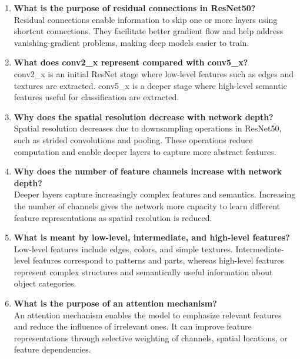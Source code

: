 \documentclass[10pt]{article}
\begin{document}
\begin{enumerate}

\item \textbf{What is the purpose of residual connections in ResNet50?}\\
Residual connections enable information to skip one or more layers using shortcut connections. They facilitate better gradient flow and help address vanishing-gradient problems, making deep models easier to train.

\item \textbf{What does conv2\_x represent compared with conv5\_x?}\\
conv2\_x is an initial ResNet stage where low-level features such as edges and textures are extracted. conv5\_x is a deeper stage where high-level semantic features useful for classification are extracted.

\item \textbf{Why does the spatial resolution decrease with network depth?}\\
Spatial resolution decreases due to downsampling operations in ResNet50, such as strided convolutions and pooling. These operations reduce computation and enable deeper layers to capture more abstract features.

\item \textbf{Why does the number of feature channels increase with network depth?}\\
Deeper layers capture increasingly complex features and semantics. Increasing the number of channels gives the network more capacity to learn different feature representations as spatial resolution is reduced.

\item \textbf{What is meant by low-level, intermediate, and high-level features?}\\
Low-level features include edges, colors, and simple textures. Intermediate-level features correspond to patterns and parts, whereas high-level features represent complex structures and semantically useful information about object categories.

\item \textbf{What is the purpose of an attention mechanism?}\\
An attention mechanism enables the model to emphasize relevant features and reduce the influence of irrelevant ones. It can improve feature representations through selective weighting of channels, spatial locations, or feature dependencies.


\end{enumerate}
\end{document}
